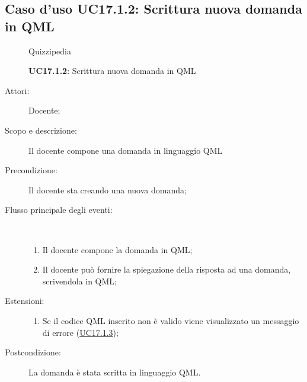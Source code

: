 \subsection{Caso d'uso UC17.1.2: Scrittura nuova domanda in QML}
\begin{figure}[H]
	\centering
	\begin{resizedtikzpicture}{\textwidth}
		\begin{umlsystem}[x=0, fill=lightgray!20]{Quizzipedia}
		\end{umlsystem}
	\end{resizedtikzpicture}
	\caption{\textbf{UC17.1.2}: Scrittura nuova domanda in QML}
	\label{UC17.1.2}
\end{figure}
\begin{description}
	\item[Attori:] Docente;
	\item[Scopo e descrizione:] Il docente compone una domanda in linguaggio QML
	\item[Precondizione:] Il docente sta creando una nuova domanda;
	
	\item[Flusso principale degli eventi:] \ 
	\begin{enumerate}
		\item Il docente compone la domanda in QML;
		\item Il docente può fornire la spiegazione della risposta ad una domanda, scrivendola in QML;
		
	\end{enumerate}
	\item[Estensioni:]
	\begin{enumerate}
		\item Se il codice QML inserito non è valido viene visualizzato un messaggio di errore (\hyperlink{UC17.1.3}{UC17.1.3});
		
	\end{enumerate}
	\item[Postcondizione:] La domanda è stata scritta in linguaggio QML.
\end{description}
\hypertarget{UC17.1.3}{}
